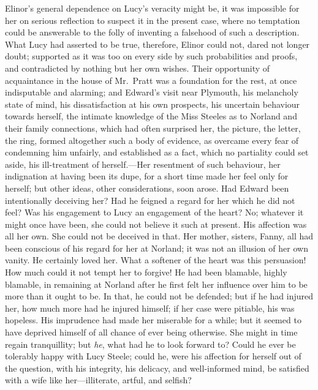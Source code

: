  Elinor's general dependence on
Lucy's veracity might be, it was impossible for her
on serious reflection to suspect it in the present case,
where no temptation could be answerable to the folly
of inventing a falsehood of such a description.  What Lucy
had asserted to be true, therefore, Elinor could not,
dared not longer doubt; supported as it was too on every
side by such probabilities and proofs, and contradicted
by nothing but her own wishes.  Their opportunity of
acquaintance in the house of Mr.\ Pratt was a foundation
for the rest, at once indisputable and alarming; and Edward's
visit near Plymouth, his melancholy state of mind,
his dissatisfaction at his own prospects, his uncertain
behaviour towards herself, the intimate knowledge of the
Miss Steeles as to Norland and their family connections,
which had often surprised her, the picture, the letter,
the ring, formed altogether such a body of evidence,
as overcame every fear of condemning him unfairly,
and established as a fact, which no partiality could
set aside, his ill-treatment of herself.---Her resentment
of such behaviour, her indignation at having been its dupe,
for a short time made her feel only for herself;
but other ideas, other considerations, soon arose.
Had Edward been intentionally deceiving her?  Had he feigned
a regard for her which he did not feel?  Was his engagement
to Lucy an engagement of the heart?  No; whatever it might
once have been, she could not believe it such at present.
His affection was all her own.  She could not be deceived
in that.  Her mother, sisters, Fanny, all had been
conscious of his regard for her at Norland; it was not
an illusion of her own vanity.  He certainly loved her.
What a softener of the heart was this persuasion!  How much
could it not tempt her to forgive!  He had been blamable,
highly blamable, in remaining at Norland after he first
felt her influence over him to be more than it ought
to be.  In that, he could not be defended; but if he
had injured her, how much more had he injured himself;
if her case were pitiable, his was hopeless.
His imprudence had made her miserable for a while; but it
seemed to have deprived himself of all chance of ever
being otherwise.  She might in time regain tranquillity;
but \emph{he}, what had he to look forward to?  Could he
ever be tolerably happy with Lucy Steele; could he,
were his affection for herself out of the question,
with his integrity, his delicacy, and well-informed mind,
be satisfied with a wife like her---illiterate, artful,
and selfish?

